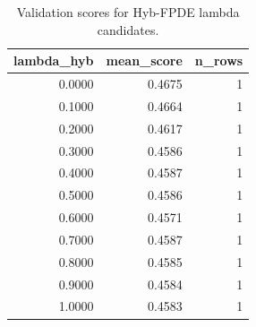 \begin{table}[t]
\caption{Validation scores for Hyb-FPDE lambda candidates.}
\label{tab:lambda_distribution_computed}
\centering
\begin{tabular}{rrr}
\toprule
lambda\_hyb & mean\_score & n\_rows \\
\midrule
0.0000 & 0.4675 & 1 \\
0.1000 & 0.4664 & 1 \\
0.2000 & 0.4617 & 1 \\
0.3000 & 0.4586 & 1 \\
0.4000 & 0.4587 & 1 \\
0.5000 & 0.4586 & 1 \\
0.6000 & 0.4571 & 1 \\
0.7000 & 0.4587 & 1 \\
0.8000 & 0.4585 & 1 \\
0.9000 & 0.4584 & 1 \\
1.0000 & 0.4583 & 1 \\
\bottomrule
\end{tabular}

\end{table}
